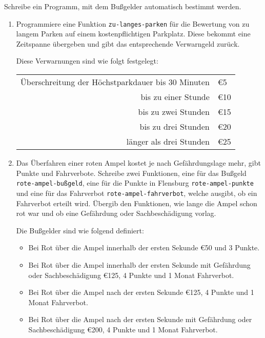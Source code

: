 \begin{aufgabe}
  Schreibe ein Programm, mit dem Bußgelder
  automatisch bestimmt werden.
  
  \begin{enumerate}
  \item Programmiere eine Funktion \lstinline{zu-langes-parken}
    für die Bewertung von zu langem Parken auf einem kostenpflichtigen
    Parkplatz. Diese bekommt eine Zeitspanne übergeben und gibt das 
    entsprechende Verwarngeld zurück.
    
    Diese Verwarnungen sind wie folgt festgelegt:
    \begin{flushleft}
      \begin{tabular}{rl}
    Überschreitung der Höchstparkdauer bis 30 Minuten & \euro{5}\\
    bis zu einer Stunde & \euro{10}\\
    bis zu zwei Stunden & \euro{15}\\
    bis zu drei Stunden & \euro{20}\\
    länger als drei Stunden &  \euro{25}
      \end{tabular}
    \end{flushleft}
    
  \item Das Überfahren einer roten Ampel kostet je nach
    Gefährdungslage mehr, gibt Punkte und Fahrverbote. Schreibe
    zwei Funktionen, eine für das Bußgeld \lstinline{rote-ampel-bußgeld}, 
    eine für die Punkte in Flensburg \lstinline{rote-ampel-punkte} 
    und eine für das Fahrverbot \lstinline{rote-ampel-fahrverbot}, 
    welche ausgibt, ob ein Fahrverbot erteilt wird. Übergib
    den Funktionen, wie lange die Ampel schon rot war und ob eine
    Gefährdung oder Sachbeschädigung vorlag.
    
    Die Bußgelder sind wie folgend definiert:
    \begin{itemize}
    \item Bei Rot über die Ampel innerhalb der ersten Sekunde			
      \euro{50} und 3 Punkte.
    \item Bei Rot über die Ampel innerhalb der ersten Sekunde mit
      Gefährdung oder Sachbeschädigung \euro{125}, 4 		
      Punkte und 1 Monat Fahrverbot.
    \item Bei Rot über die Ampel nach der ersten Sekunde \euro{125},
      4 Punkte und 1 Monat Fahrverbot.
    \item Bei Rot über die Ampel nach der ersten Sekunde mit
      Gefährdung oder Sachbeschädigung \euro{200}, 4
      Punkte und 1 Monat Fahrverbot.
    \end{itemize}
    
    
  \end{enumerate}
\end{aufgabe}



